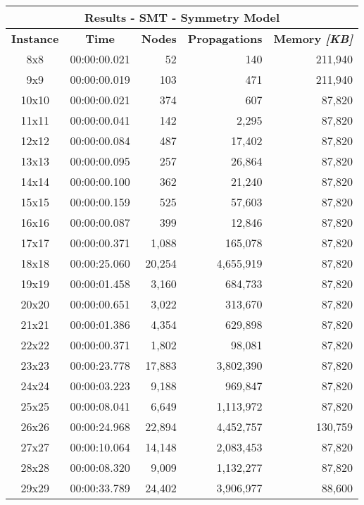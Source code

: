 
\begin{center}
    \begin{tabular}{|c|c|r|r|r|}
        \hline
        \multicolumn{5}{|c|}{\textbf{Results - SMT - Symmetry Model}} \\
        \hline
        \textbf{Instance} & \textbf{Time} & \textbf{Nodes} & \textbf{Propagations} & \textbf{Memory \textit{[KB]}} \\
        
        \hline
		8x8 & 00:00:00.021 & 52 & 140 & 211,940 \\ \hline
		9x9 & 00:00:00.019 & 103 & 471 & 211,940 \\ \hline
		10x10 & 00:00:00.021 & 374 & 607 & 87,820 \\ \hline
		11x11 & 00:00:00.041 & 142 & 2,295 & 87,820 \\ \hline
		12x12 & 00:00:00.084 & 487 & 17,402 & 87,820 \\ \hline
		13x13 & 00:00:00.095 & 257 & 26,864 & 87,820 \\ \hline
		14x14 & 00:00:00.100 & 362 & 21,240 & 87,820 \\ \hline
		15x15 & 00:00:00.159 & 525 & 57,603 & 87,820 \\ \hline
		16x16 & 00:00:00.087 & 399 & 12,846 & 87,820 \\ \hline
		17x17 & 00:00:00.371 & 1,088 & 165,078 & 87,820 \\ \hline
		18x18 & 00:00:25.060 & 20,254 & 4,655,919 & 87,820 \\ \hline
		19x19 & 00:00:01.458 & 3,160 & 684,733 & 87,820 \\ \hline
		20x20 & 00:00:00.651 & 3,022 & 313,670 & 87,820 \\ \hline
		21x21 & 00:00:01.386 & 4,354 & 629,898 & 87,820 \\ \hline
		22x22 & 00:00:00.371 & 1,802 & 98,081 & 87,820 \\ \hline
		23x23 & 00:00:23.778 & 17,883 & 3,802,390 & 87,820 \\ \hline
		24x24 & 00:00:03.223 & 9,188 & 969,847 & 87,820 \\ \hline
		25x25 & 00:00:08.041 & 6,649 & 1,113,972 & 87,820 \\ \hline
		26x26 & 00:00:24.968 & 22,894 & 4,452,757 & 130,759 \\ \hline
		27x27 & 00:00:10.064 & 14,148 & 2,083,453 & 87,820 \\ \hline
		28x28 & 00:00:08.320 & 9,009 & 1,132,277 & 87,820 \\ \hline
		29x29 & 00:00:33.789 & 24,402 & 3,906,977 & 88,600 \\ \hline

\end{tabular}
\end{center}
